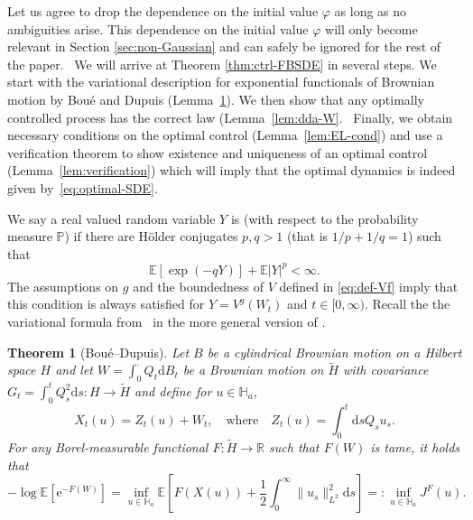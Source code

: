 \documentclass[11pt, a4paper]{scrartcl}
\numberwithin{equation}{section}
\theoremstyle{plain}
\newtheorem{theorem}[foo]{Theorem}
\theoremstyle{remark}
\newcommand{\backassign}{=:}
\newcommand{\mathd}{\mathrm{d}}
\newcommand{\mathe}{\mathrm{e}}
\newcommand{\tmtextit}[1]{\text{{\itshape{#1}}}}
\begin{document}
Let us agree to drop the dependence on the initial value $\varphi$ as long as
no ambiguities arise. This dependence on the initial value $\varphi$ will only
become relevant in Section \ref{sec:non-Gaussian} and  can safely be ignored for
the rest of the paper. \ We will arrive at Theorem \ref{thm:ctrl-FBSDE} in
several steps. We start with the variational description for exponential
functionals of Brownian motion by Bou{\'e} and Dupuis
(Lemma~\ref{lem:BD-form}). We then show that any optimally controlled process
has the correct law (Lemma~\ref{lem:dda-W}. \
Finally, we obtain necessary conditions on the optimal control
(Lemma~\ref{lem:EL-cond}) and use a verification theorem to show existence and
uniqueness of an optimal control (Lemma~\ref{lem:verification}) which will
imply that the optimal dynamics is indeed given by~\eqref{eq:optimal-SDE}.

We say a real valued random variable $Y$ is \tmtextit{tame} (with respect to
the probability measure $\mathbb{P}$) if there are H{\"o}lder conjugates $p, q
	> 1$ (that is $1 / p + 1 / q = 1$) such that
\[ \mathbb{E} [\exp (- qY)] +\mathbb{E} | Y |^p < \infty . \]
The assumptions on $g$ and the
boundedness of $V$ defined in \eqref{eq:def-Vf} imply that this condition is
always satisfied for $Y = V^g (W_t)$ and $t \in [0, \infty)$. Recall the the
variational formula from~{\cite{boueVariationalRepresentationCertain1998}} in
the more general version of {\cite{ustunelVariationalCalculationLaplace2014}}.

\begin{theorem}[Bou{\'e}--Dupuis]
	\label{lem:BD-form}Let $B$ be a cylindrical Brownian motion on a Hilbert
	space $H$ and let $W = \int_0^{\cdot} Q_t \mathd B_t$ be a Brownian motion
	on $\tilde{H}$ with covariance $G_t = \int_0^t Q_s^2 \mathd s : H
		\rightarrow \tilde{H}$ and define for $u \in \mathbb{H}_a$,
	\begin{equation}
		X_t (u) = Z_t (u) + W_t, \label{eq:BD-Xu} \quad \text{where} \quad Z_t
		(u) = \int_0^t \mathd s Q_s u_s .
	\end{equation}
	For any Borel-measurable functional $F : \tilde{H} \rightarrow \mathbb{R}$
	such that $F (W)$ is tame, it holds that
	\begin{equation}
		- \log \mathbb{E} [\mathe^{- F (W)}] = \inf_{u \in \mathbb{H}_a}
		\mathbb{E} \left[ F (X (u)) + \frac{1}{2} \int_0^{\infty} \| u_s
			\|^2_{L^2} \mathd s \right] \backassign \inf_{u \in \mathbb{H}_a} J^F (u)
		. \label{eq:BD-OC}
	\end{equation}
\end{theorem}
\end{document}

